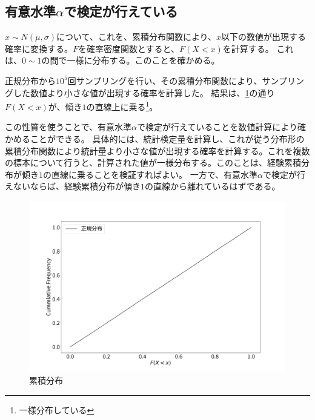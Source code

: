 

\subsection{有意水準$\alpha$で検定が行えている}
$x\sim N(\mu,\sigma)$について、これを、累積分布関数により、$x$以下の数値が出現する確率に変換する。$F$を確率密度関数とすると、$F(X<x)$を計算する。
これは、$0\sim 1$の間で一様に分布する。このことを確かめる。

正規分布から$10^5$回サンプリングを行い、その累積分布関数により、サンプリングした数値より小さな値が出現する確率を計算した。
結果は、\ref{fig:test_cummlative_distribution}の通り$F(X<x)$が、傾き$1$の直線上に乗る\footnote{一様分布している}。

この性質を使うことで、有意水準$\alpha$で検定が行えていることを数値計算により確かめることができる。
具体的には、統計検定量を計算し、これが従う分布形の累積分布関数により統計量より小さな値が出現する確率を計算する。これを複数の標本について行うと、計算された値が一様分布する。このことは、経験累積分布が傾き$1$の直線に乗ることを検証すればよい。
一方で、有意水準$\alpha$で検定が行えないならば、経験累積分布が傾き$1$の直線から離れているはずである。

\begin{figure}
  \begin{center}
    \includegraphics[width=15cm]{./image/04_/test_cummlative_distribution.pdf}
    \caption{累積分布}
   \label{fig:test_cummlative_distribution}
    \end{center}
\end{figure}



